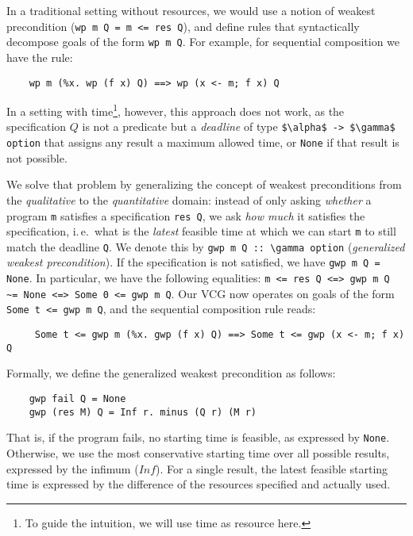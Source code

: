 \documentclass[acmsmall]{acmart}
\newcommand{\is}{\lstinline[language=isabelle]}
\newcommand{\ie}{i.\,e.\xspace}
\begin{document}
In a traditional setting without resources, we would use a notion of weakest precondition (\is$wp m Q = m <= res Q$), and define rules that syntactically decompose goals of the form \is$wp m Q$. 
For example, for sequential composition we have the rule:
\begin{lstlisting}
    wp m (%x. wp (f x) Q) ==> wp (x <- m; f x) Q
\end{lstlisting}
\clearpage
In a setting with time\footnote{To guide the intuition, we will use time as resource here.}, however, this approach does not work, as the specification $Q$ is not a predicate but a \emph{deadline} of type \is{$\alpha$ -> $\gamma$ option} that assigns any result a maximum allowed time, or \is{None} if that result is not possible.

We solve that problem by generalizing the concept of weakest preconditions from the \emph{qualitative} to the \emph{quantitative} domain:
instead of only asking \emph{whether} a program \is{m} satisfies a specification \is{res Q}, we ask \emph{how much} it satisfies the specification, \ie\ what is the \emph{latest} feasible time at which we can start \is{m} to still match the deadline \is{Q}.
We denote this by \is$gwp m Q :: \gamma option$ (\emph{generalized weakest precondition}).
If the specification is not satisfied, we have \is$gwp m Q = None$.
In particular, we have the following equalities: \is{m <= res Q <=> gwp m Q ~= None <=> Some 0 <= gwp m Q}.
%
Our VCG now operates on goals of the form \is{Some t <= gwp m Q}, and the sequential composition rule reads:
\begin{lstlisting}
     Some t <= gwp m (%x. gwp (f x) Q) ==> Some t <= gwp (x <- m; f x) Q
\end{lstlisting}
Formally, we define the generalized weakest precondition as follows:
\begin{lstlisting}
    gwp fail Q = None
    gwp (res M) Q = Inf r. minus (Q r) (M r)
\end{lstlisting}
That is, if the program fails, no starting time is feasible, as expressed by \is$None$. Otherwise, we use the most conservative starting time over all possible results, expressed by the infimum ($Inf$).
For a single result, the latest feasible starting time is expressed by the difference of the resources specified and actually used.
%
\end{document}
